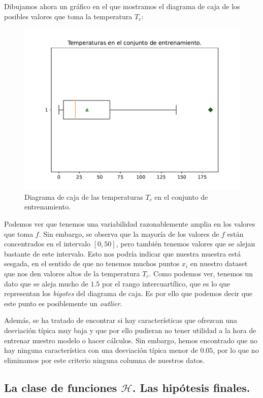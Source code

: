 \documentclass[a4paper, 20pt]{article}
\begin{document}
Dibujamos ahora un gráfico en el que mostramos el diagrama de caja de los posibles valores que toma la temperatura $T_c$:

\begin{figure}[H]
  \centering
  \includegraphics[scale = 0.4]{boxplot_y.pdf}
  \caption{Diagrama de caja de las temperaturas $T_c$ en el conjunto de entrenamiento.}
\end{figure}

Podemos ver que tenemos una variabilidad razonablemente amplia en los valores que toma $f$. Sin embargo, se observa que la mayoría de los valores de $f$ están concentrados en el intervalo $[0,50]$, pero también tenemos valores que se alejan bastante de este intervalo. Esto nos podría indicar que nuestra muestra está sesgada, en el sentido de que no tenemos muchos puntos $x_i$ en nuestro dataset que nos den valores altos de la temperatura $T_c$.  Como podemos ver, tenemos un dato que se aleja mucho de $1.5$ por el rango intercuartílico, que es lo que representan los \emph{bigotes} del diagrama de caja. Es por ello que podemos decir que este punto es posiblemente un \emph{outlier}.

Además, se ha tratado de encontrar si hay características que ofrezcan una desviación típica muy baja y que por ello pudieran no tener utilidad a la hora de entrenar nuestro modelo o hacer cálculos. Sin embargo, hemos encontrado que no hay ninguna característica con una desviación típica menor de $0.05$, por lo que no eliminamos por este criterio ninguna columna de nuestros datos.


\subsection{La clase de funciones $\mathcal H$. Las hipótesis finales.}
\end{document}
